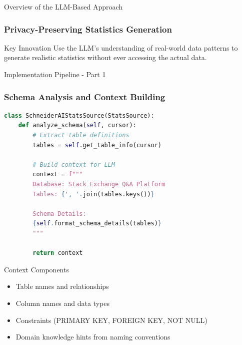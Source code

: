 \documentclass[smaller]{beamer}
\begin{document}
\begin{frame}{Overview of the LLM-Based Approach}
\frametitle{Privacy-Preserving Statistics Generation}

\begin{center}
\end{center}

\vspace{0.5cm}

\begin{block}{Key Innovation}
Use the LLM's understanding of real-world data patterns to generate realistic statistics without ever accessing the actual data.
\end{block}


\end{frame}

\begin{frame}[fragile]{Implementation Pipeline - Part 1}
\frametitle{Schema Analysis and Context Building}

\begin{lstlisting}[language=Python]
class SchneiderAIStatsSource(StatsSource):
    def analyze_schema(self, cursor):
        # Extract table definitions
        tables = self.get_table_info(cursor)
        
        # Build context for LLM
        context = f"""
        Database: Stack Exchange Q&A Platform
        Tables: {', '.join(tables.keys())}
        
        Schema Details:
        {self.format_schema_details(tables)}
        """
        
        return context
\end{lstlisting}

\begin{block}{Context Components}
\begin{itemize}
    \item Table names and relationships
    \item Column names and data types
    \item Constraints (PRIMARY KEY, FOREIGN KEY, NOT NULL)
    \item Domain knowledge hints from naming conventions
\end{itemize}
\end{block}

\end{frame}
\end{document}

